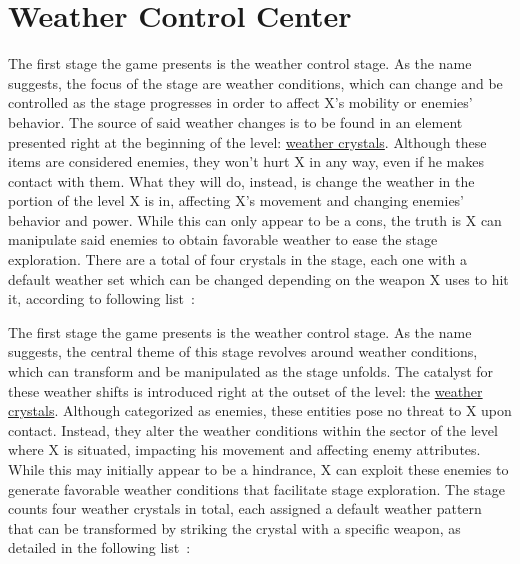 \section{Weather Control Center}
The first stage the game presents is the weather control stage. As the name suggests, the focus of the stage are weather conditions, which can change and be controlled as the stage progresses in order to affect X's mobility or enemies' behavior. The source of said weather changes is to be found in an element presented right at the beginning of the level: \hyperlink{enem:Weather_crystal}{weather crystals}. Although these items are considered enemies, they won't hurt X in any way, even if he makes contact with them. What they will do, instead, is change the weather in the portion of the level X is in, affecting X's movement and changing enemies' behavior and power. While this can only appear to be a cons, the truth is X can manipulate said enemies to obtain favorable weather to ease the stage exploration. There are a total of four crystals in the stage, each one with a default weather set which can be changed depending on the weapon X uses to hit it, according to following list~\cite{wiki:Weather_crystal}:

The first stage the game presents is the weather control stage. As the name suggests, the central theme of this stage revolves around weather conditions, which can transform and be manipulated as the stage unfolds. The catalyst for these weather shifts is introduced right at the outset of the level: the \hyperlink{enem:Weather_crystal}{weather crystals}. Although categorized as enemies, these entities pose no threat to X upon contact. Instead, they alter the weather conditions within the sector of the level where X is situated, impacting his movement and affecting enemy attributes. While this may initially appear to be a hindrance, X can exploit these enemies to generate favorable weather conditions that facilitate stage exploration. The stage counts four weather crystals in total, each assigned a default weather pattern that can be transformed by striking the crystal with a specific weapon, as detailed in the following list~\cite{wiki:Weather_crystal}:

